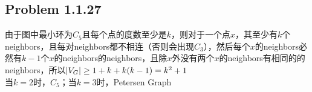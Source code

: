 \subsection*{Problem 1.1.27}
由于图中最小环为$C_5$且每个点的度数至少是$k$，则对于一个点$x$，其至少有$k$个neighbors，且每对neighbors都不相连（否则会出现$C_3$），然后每个$x$的neighbors必然有$k - 1$个$x$的neighbors的neighbors，且除$x$外没有两个$x$的neighbors有相同的的neighbors，所以$\left\lvert V_G \right\rvert \geq 1 + k + k(k - 1) = k^2 + 1$ \\
\indent 当$k = 2$时，$C_5$；当$k = 3$时，Petersen Graph

